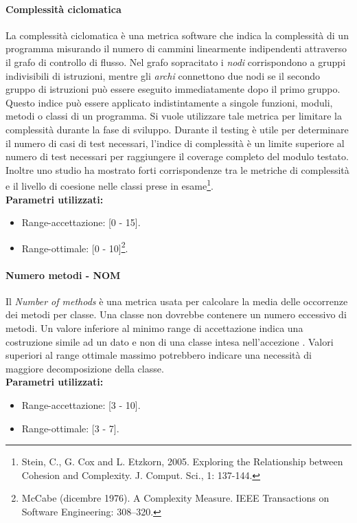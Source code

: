 			\paragraph{Complessità ciclomatica}
			La complessità ciclomatica è una metrica software che indica la complessità di un programma misurando il numero di cammini linearmente indipendenti attraverso il grafo di controllo di flusso. Nel grafo sopracitato i \emph{nodi} corrispondono a gruppi indivisibili di istruzioni, mentre gli \emph{archi} connettono due nodi se il secondo gruppo di istruzioni può essere eseguito immediatamente dopo il primo gruppo.
			Questo indice può essere applicato indistintamente a singole funzioni, moduli, metodi o classi di un programma.
			Si vuole utilizzare tale metrica per limitare la complessità durante la fase di sviluppo.
			Durante il testing è utile per determinare il numero di casi di test necessari, l'indice di complessità è un limite superiore al numero di test necessari per raggiungere il coverage completo del modulo testato. Inoltre uno studio ha mostrato forti corrispondenze tra le metriche di complessità e il livello di coesione nelle classi prese in esame\footnote{Stein, C., G. Cox and L. Etzkorn, 2005. Exploring the Relationship between Cohesion and Complexity. J. Comput. Sci., 1: 137-144.}.\\
		\textbf{Parametri utilizzati:}
			\begin{itemize}
				\item Range-accettazione: [0 - 15].
				\item Range-ottimale: [0 - 10]\footnote{McCabe (dicembre 1976). A Complexity Measure. IEEE Transactions on Software Engineering: 308–320.}.
			\end{itemize}
			
			\paragraph{Numero metodi - NOM}
			Il \emph{Number of methods} è una metrica usata per calcolare la media delle occorrenze dei metodi per classe. Una classe non dovrebbe contenere un numero eccessivo di metodi. Un valore inferiore al minimo range di accettazione indica una costruzione simile ad un dato e non di una classe intesa nell'accezione . Valori superiori al range ottimale massimo potrebbero indicare una necessità di maggiore decomposizione della classe.\\
			\textbf{Parametri utilizzati:}
			\begin{itemize}
				\item Range-accettazione: [3 - 10].
				\item Range-ottimale: [3 - 7].
			\end{itemize}
			

